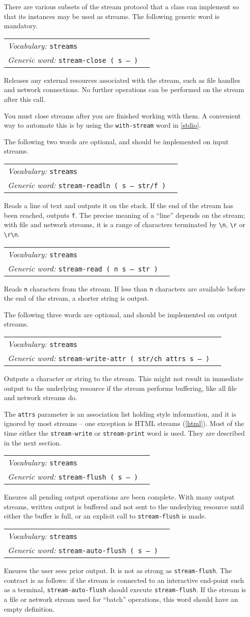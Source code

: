 \documentclass{book}
\newcommand{\vocabulary}[1]{\emph{Vocabulary:} \texttt{#1}&\\}
\newcommand{\genericword}[2]{\index{\texttt{#1}}\emph{Generic word:} \texttt{#2}&\\}
\newcommand{\wordtable}[1]{


\begin{tabularx}{12cm}{lX}
\hline
#1
\hline
\end{tabularx}

}
\begin{document}
There are various subsets of the stream protocol that a class can implement so that its instances may be used as streams. The following generic word is mandatory.

\wordtable{
\vocabulary{streams}
\genericword{stream-close}{stream-close ( s -- )}
}
Releases any external resources associated with the stream, such as file handles and network connections. No further operations can be performed on the stream after this call.

You must close streams after you are finished working with them. A convenient way to automate this is by using the \texttt{with-stream} word in \ref{stdio}.

The following two words are optional, and should be implemented on input streams.
\wordtable{
\vocabulary{streams}
\genericword{stream-readln}{stream-readln ( s -- str/f )}
}
Reads a line of text and outputs it on the stack. If the end of the stream has been reached, outputs \texttt{f}. The precise meaning of a ``line'' depends on the stream; with file and network streams, it is a range of characters terminated by \verb|\n|, \verb|\r| or \verb|\r\n|.
\wordtable{
\vocabulary{streams}
\genericword{stream-read}{stream-read ( n s -- str )}
}
Reads \texttt{n} characters from the stream. If less than \texttt{n} characters are available before the end of the stream, a shorter string is output.

The following three words are optional, and should be implemented on output streams.

\wordtable{
\vocabulary{streams}
\genericword{stream-write-attr}{stream-write-attr ( str/ch attrs s -- )}
}
Outputs a character or string to the stream. This might not result in immediate output to the underlying resource if the stream performs buffering, like all file and network streams do. 

The \texttt{attrs} parameter is an association list holding style information, and it is ignored by most streams -- one exception is HTML streams (\ref{html}). Most of the time either the \texttt{stream-write} or \texttt{stream-print} word is used. They are described in the next section.

\wordtable{
\vocabulary{streams}
\genericword{stream-flush}{stream-flush ( s -- )}
}
Ensures all pending output operations are been complete. With many output streams, written output is buffered and not sent to the underlying resource until either the buffer is full, or an explicit call to \texttt{stream-flush} is made.

\wordtable{
\vocabulary{streams}
\genericword{stream-auto-flush}{stream-auto-flush ( s -- )}
}
Ensures the user sees prior output. It is not as strong as \texttt{stream-flush}. The contract is as follows: if the stream is connected to an interactive end-point such as a terminal, \texttt{stream-auto-flush} should execute \texttt{stream-flush}. If the stream is a file or network stream used for ``batch'' operations, this word should have an empty definition.
\end{document}
